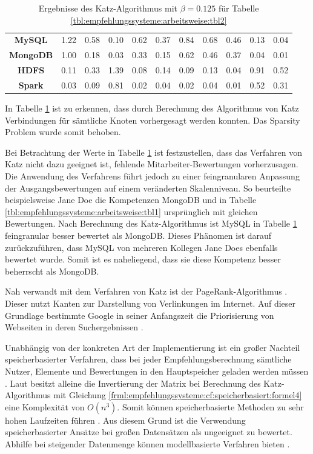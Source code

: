 \begin{table}[h]
\begin{tabular}{c|c|c|c|c|c|c|c|c|c|c}
		\textbf{MySQL}    & 1.22 & 0.58 & 0.10 & 0.62 & 0.37 & 0.84 & 0.68 & 0.46 & 0.13 & 0.04\\
		\textbf{MongoDB}  & 1.00 & 0.18 & 0.03 & 0.33 & 0.15 & 0.62 & 0.46 & 0.37 & 0.04 & 0.01\\
		\textbf{HDFS}     & 0.11 & 0.33 & 1.39 & 0.08 & 0.14 & 0.09 & 0.13 & 0.04 & 0.91 & 0.52\\
		\textbf{Spark}    & 0.03 & 0.09 & 0.81 & 0.02 & 0.04 & 0.02 & 0.04 & 0.01 & 0.52 & 0.31
	\end{tabular}
	\caption{Ergebnisse des Katz-Algorithmus mit $\beta = 0.125$ für Tabelle \ref{tbl:empfehlungssysteme:arbeitsweise:tbl2}}
	\label{tbl:empfehlungssysteme:arbeitsweise:tbl3}
\end{table}

In Tabelle \ref{tbl:empfehlungssysteme:arbeitsweise:tbl3} ist zu erkennen, dass durch Berechnung des Algorithmus von Katz Verbindungen für sämtliche Knoten vorhergesagt werden konnten. Das Sparsity Problem wurde somit behoben.

Bei Betrachtung der Werte in Tabelle \ref{tbl:empfehlungssysteme:arbeitsweise:tbl3} ist festzustellen, dass das Verfahren von Katz nicht dazu geeignet ist, fehlende Mitarbeiter-Bewertungen vorherzusagen. Die Anwendung des Verfahrens führt jedoch zu einer feingranularen Anpassung der Ausgangsbewertungen auf einem veränderten Skalenniveau. So beurteilte beispielsweise Jane Doe die Kompetenzen MongoDB und  in Tabelle \ref{tbl:empfehlungssysteme:arbeitsweise:tbl1} ursprünglich mit gleichen Bewertungen. Nach Berechnung des Katz-Algorithmus ist MySQL in Tabelle \ref{tbl:empfehlungssysteme:arbeitsweise:tbl3} feingranular besser bewertet als MongoDB. Dieses Phänomen ist darauf zurückzuführen, dass MySQL von mehreren Kollegen Jane Does ebenfalls bewertet wurde. Somit ist es naheliegend, dass sie diese Kompetenz besser beherrscht als MongoDB.

Nah verwandt mit dem Verfahren von Katz ist der PageRank-Algorithmus \cite[S. 1]{was:2018}. Dieser nutzt Kanten zur Darstellung von Verlinkungen im Internet. Auf dieser Grundlage bestimmte Google in seiner Anfangszeit die Priorisierung von Webseiten in deren Suchergebnissen \cite[S. 3ff.]{page:1999}.

Unabhängig von der konkreten Art der Implementierung ist ein großer Nachteil speicherbasierter Verfahren, dass bei jeder Empfehlungsberechnung sämtliche Nutzer, Elemente und Bewertungen in den Hauptspeicher geladen werden müssen \cite[S. 8]{yang:2016}. Laut \textcite[S. 3]{landherr:2010} besitzt alleine die Invertierung der Matrix bei Berechnung des Katz-Algorithmus mit Gleichung \ref{frml:empfehlungssysteme:cf:speicherbasiert:formel4} eine Komplexität von $O(n^3)$. Somit können speicherbasierte Methoden zu sehr hohen Laufzeiten führen \cite[S. 2]{zhang:2010}. Aus diesem Grund ist die Verwendung speicherbasierter Ansätze bei großen Datensätzen als ungeeignet zu bewertet. Abhilfe bei steigender Datenmenge können modellbasierte Verfahren bieten \cite[S. 8]{yang:2016}.

